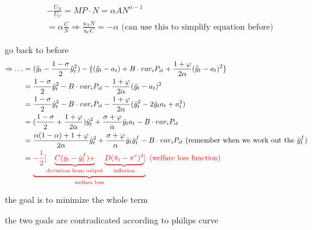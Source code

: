 \begin{align}
& -\frac{U_N}{U_C}=MP \cdot N=\alpha A N^{\alpha-1}
\\& = \alpha \frac{C}{N} \Rightarrow \frac{u_N N}{u_C C}=-\alpha\text{ (can use this to simplify equation before)}
\end{align}

go back to before
\begin{align}
\Rightarrow \dots & = (\hat y_t -\frac{1-\sigma}{2}\hat y_t^2)-\{(\hat y_t -a_t)+B \cdot var_i P_{it}+\frac{1+\varphi}{2 \alpha}(\hat y_t -a_t)^2\}
\\& =\frac{1-\sigma}{2}\hat y_t^2 -B \cdot var_i P_{it}-\frac{1+\varphi}{2 \alpha}(\hat y_t -a_t)^2
\\& = \frac{1-\sigma}{2}\hat y_t^2 -B \cdot var_i P_{it}-\frac{1+\varphi}{2 \alpha}(\hat y_t^2-2 \hat y_t a_t +a_t^2)
\\& = (\frac{1-\sigma}{2}+\frac{1+\varphi}{2 \alpha})\hat y_t^2 + \frac{\sigma+\varphi}{\alpha}\hat y_t a_t -B \cdot var_i P_{it}
\\& =  \frac{\alpha (1-\alpha)+1+\varphi}{2 \alpha}\hat y_t^2 + \frac{\sigma+\varphi}{\alpha}\hat y_t \hat y_t^f -B \cdot var_i P_{it} \text{ (remember when we work out the $\hat y_t^f$)}
\\& =
\color{red}
\underbrace{
-\frac{1}{2}[
\underbrace{
C(\hat y_t -\hat y_t^f)+
}_\text{deviation from output}
\underbrace{
D(\hat \pi_t - \pi^*)^2
}_\text{inflation}
]
}_\text{welfare loss} \text{ (welfare loss function)}
\end{align}

the goal is to minimize the whole term


\begin{blueblock}
\begin{note}
\end{note}
the two goals are contradicated according to philips curve
\end{blueblock}
